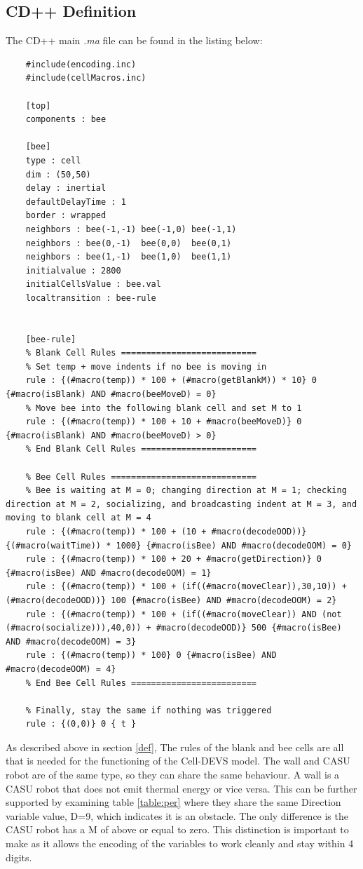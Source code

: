 \documentclass[conference,compsoc,onecolumn]{IEEEtran}
\begin{document}
\subsection{CD++ Definition}

The CD++ main \emph{.ma} file can be found in the listing below:
\begin{lstlisting}
	#include(encoding.inc)
	#include(cellMacros.inc)
	
	[top]
	components : bee
	
	[bee]
	type : cell
	dim : (50,50)
	delay : inertial
	defaultDelayTime : 1
	border : wrapped
	neighbors : bee(-1,-1) bee(-1,0) bee(-1,1)
	neighbors : bee(0,-1)  bee(0,0)  bee(0,1)
	neighbors : bee(1,-1)  bee(1,0)  bee(1,1)
	initialvalue : 2800
	initialCellsValue : bee.val
	localtransition : bee-rule
	
	
	[bee-rule]
	% Blank Cell Rules ===========================
	% Set temp + move indents if no bee is moving in
	rule : {(#macro(temp)) * 100 + (#macro(getBlankM)) * 10} 0 {#macro(isBlank) AND #macro(beeMoveD) = 0}
	% Move bee into the following blank cell and set M to 1
	rule : {(#macro(temp)) * 100 + 10 + #macro(beeMoveD)} 0 {#macro(isBlank) AND #macro(beeMoveD) > 0}
	% End Blank Cell Rules =======================
	
	% Bee Cell Rules =============================
	% Bee is waiting at M = 0; changing direction at M = 1; checking direction at M = 2, socializing, and broadcasting indent at M = 3, and moving to blank cell at M = 4
	rule : {(#macro(temp)) * 100 + (10 + #macro(decodeOOD))} {(#macro(waitTime)) * 1000} {#macro(isBee) AND #macro(decodeOOM) = 0}
	rule : {(#macro(temp)) * 100 + 20 + #macro(getDirection)} 0 {#macro(isBee) AND #macro(decodeOOM) = 1}
	rule : {(#macro(temp)) * 100 + (if((#macro(moveClear)),30,10)) + (#macro(decodeOOD))} 100 {#macro(isBee) AND #macro(decodeOOM) = 2}
	rule : {(#macro(temp)) * 100 + (if((#macro(moveClear)) AND (not (#macro(socialize))),40,0)) + #macro(decodeOOD)} 500 {#macro(isBee) AND #macro(decodeOOM) = 3}
	rule : {(#macro(temp)) * 100} 0 {#macro(isBee) AND #macro(decodeOOM) = 4}
	% End Bee Cell Rules =========================
	
	% Finally, stay the same if nothing was triggered
	rule : {(0,0)} 0 { t }
\end{lstlisting}

As described above in section \ref{def}, The rules of the blank and bee cells are all that is needed for the functioning of the Cell-DEVS model. The wall and CASU robot are of the same type, so they can share the same behaviour. A wall is a CASU robot that does not emit thermal energy or vice versa. This can be further supported by examining table \ref{table:per} where they share the same Direction variable value, D=9, which indicates it is an obstacle. The only difference is the CASU robot has a M of above or equal to zero. This distinction is important to make as it allows the encoding of the variables to work cleanly and stay within 4 digits.
\end{document}
